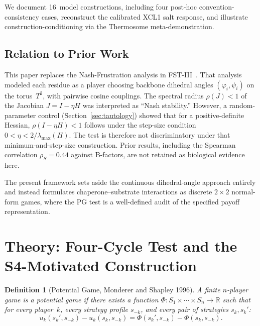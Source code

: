 \documentclass[12pt,a4paper]{article}
\newtheorem{definition}{Definition}
\begin{document}
We document 16~model constructions, including four post-hoc
convention-consistency cases, reconstruct the calibrated XCL1 salt
response, and illustrate construction-conditioning via the Thermosome
meta-demonstration.

\subsection{Relation to Prior Work}

This paper replaces the Nash-Frustration analysis in FST-III~\cite{GeigerFSTIII2025}. That analysis modeled each residue as a player
choosing backbone dihedral angles $(\varphi_i, \psi_i)$ on the
torus~$T^2$, with pairwise cosine couplings. The spectral radius
$\rho(J) < 1$ of the Jacobian $J = I - \eta H$ was interpreted as
``Nash stability.'' However, a random-parameter control
(Section~\ref{sec:tautology}) showed that for a positive-definite
Hessian, $\rho(I-\eta H)<1$ follows under the step-size condition
$0<\eta<2/\lambda_{\max}(H)$. The test is therefore not discriminatory
under that minimum-and-step-size construction. Prior results, including
the Spearman correlation $\rho_S = 0.44$ against B-factors, are not
retained as biological evidence here.

The present framework sets aside the continuous dihedral-angle approach
entirely and instead formulates chaperone--substrate interactions as
discrete $2\times 2$ normal-form games, where the PG test is a well-defined audit of the specified payoff representation.


\section{Theory: Four-Cycle Test and the S4-Motivated Construction}
\label{sec:theory}

\begin{definition}[Potential Game, Monderer and Shapley 1996]
A finite $n$-player game is a \emph{potential game} if there exists a
function $\Phi: S_1 \times \cdots \times S_n \to \mathbb{R}$ such that
for every player~$k$, every strategy profile $s_{-k}$, and every pair
of strategies $s_k, s_k'$:
\begin{equation}
  u_k(s_k', s_{-k}) - u_k(s_k, s_{-k})
  = \Phi(s_k', s_{-k}) - \Phi(s_k, s_{-k}).
  \label{eq:pg_def}
\end{equation}
\end{definition}
\end{document}

